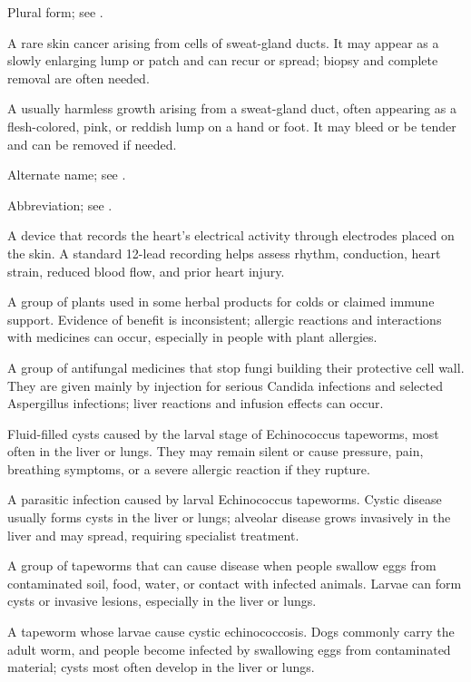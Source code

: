  Plural form; see .

 A rare skin cancer arising from cells of sweat-gland ducts. It may appear as a slowly enlarging lump or patch and can recur or spread; biopsy and complete removal are often needed.

 A usually harmless growth arising from a sweat-gland duct, often appearing as a flesh-colored, pink, or reddish lump on a hand or foot. It may bleed or be tender and can be removed if needed.

 Alternate name; see .

 Abbreviation; see .

 A device that records the heart’s electrical activity through electrodes placed on the skin. A standard 12-lead recording helps assess rhythm, conduction, heart strain, reduced blood flow, and prior heart injury.

 A group of plants used in some herbal products for colds or claimed immune support. Evidence of benefit is inconsistent; allergic reactions and interactions with medicines can occur, especially in people with plant allergies.

 A group of antifungal medicines that stop fungi building their protective cell wall. They are given mainly by injection for serious Candida infections and selected Aspergillus infections; liver reactions and infusion effects can occur.

 Fluid-filled cysts caused by the larval stage of Echinococcus tapeworms, most often in the liver or lungs. They may remain silent or cause pressure, pain, breathing symptoms, or a severe allergic reaction if they rupture.

 A parasitic infection caused by larval Echinococcus tapeworms. Cystic disease usually forms cysts in the liver or lungs; alveolar disease grows invasively in the liver and may spread, requiring specialist treatment.

 A group of tapeworms that can cause disease when people swallow eggs from contaminated soil, food, water, or contact with infected animals. Larvae can form cysts or invasive lesions, especially in the liver or lungs.

 A tapeworm whose larvae cause cystic echinococcosis. Dogs commonly carry the adult worm, and people become infected by swallowing eggs from contaminated material; cysts most often develop in the liver or lungs.

